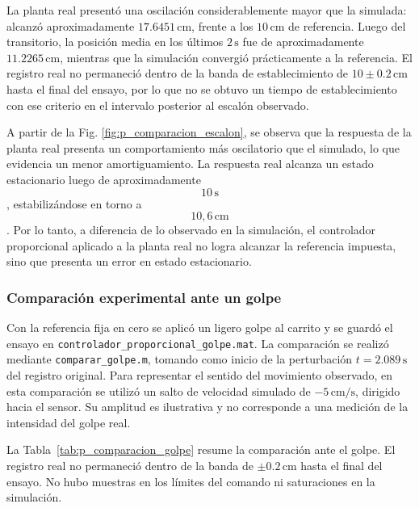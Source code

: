 \documentclass[a4paper, twoside, 10pt, spanish]{article}
\numberwithin{table}{section}
\begin{document}
    La planta real presentó una oscilación considerablemente mayor que la simulada: alcanzó aproximadamente $17.6451\,\text{cm}$, frente a los $10\,\text{cm}$ de referencia. Luego del transitorio, la posición media en los últimos $2\,\text{s}$ fue de aproximadamente $11.2265\,\text{cm}$, mientras que la simulación convergió prácticamente a la referencia. El registro real no permaneció dentro de la banda de establecimiento de $10\pm0.2\,\text{cm}$ hasta el final del ensayo, por lo que no se obtuvo un tiempo de establecimiento con ese criterio en el intervalo posterior al escalón observado.

    A partir de la Fig. \ref{fig:p_comparacion_escalon}, se observa que la respuesta de la planta real presenta un comportamiento más oscilatorio que el simulado, lo que evidencia un menor amortiguamiento. La respuesta real alcanza un estado estacionario luego de aproximadamente $$10\,\text{s}$$, estabilizándose en torno a $$10{,}6\,\text{cm}$$. Por lo tanto, a diferencia de lo observado en la simulación, el controlador proporcional aplicado a la planta real no logra alcanzar la referencia impuesta, sino que presenta un error en estado estacionario.

    \subsubsection{Comparación experimental ante un golpe}
    Con la referencia fija en cero se aplicó un ligero golpe al carrito y se guardó el ensayo en \texttt{controlador\_proporcional\_golpe.mat}. La comparación se realizó mediante \texttt{comparar\_golpe.m}, tomando como inicio de la perturbación $t=2.089\,\text{s}$ del registro original. Para representar el sentido del movimiento observado, en esta comparación se utilizó un salto de velocidad simulado de $-5\,\text{cm/s}$, dirigido hacia el sensor. Su amplitud es ilustrativa y no corresponde a una medición de la intensidad del golpe real.

    La Tabla~\ref{tab:p_comparacion_golpe} resume la comparación ante el golpe. El registro real no permaneció dentro de la banda de $\pm0.2\,\text{cm}$ hasta el final del ensayo. No hubo muestras en los límites del comando ni saturaciones en la simulación.
\end{document}
